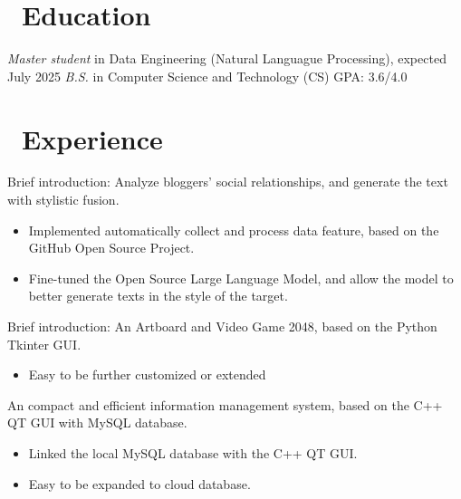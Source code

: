 \documentclass{resume}
\begin{document}



\section{\faGraduationCap\ Education}
\textit{Master student} in Data Engineering (Natural Languague Processing), expected July 2025
\textit{B.S.} in Computer Science and Technology (CS) GPA: 3.6/4.0

\section{\faUsers\ Experience}
Brief introduction: Analyze bloggers' social relationships, and generate the text with stylistic fusion.
\begin{itemize}
  \item Implemented automatically collect and process data feature, based on the GitHub Open Source Project.
  \item Fine-tuned the Open Source Large Language Model, and allow the model to better generate texts in the style of the target.
\end{itemize}

Brief introduction: An Artboard and Video Game 2048, based on the Python Tkinter GUI.
\begin{itemize}
  \item Easy to be further customized or extended

\end{itemize}


An compact and efficient information management system, based on the C++ QT GUI with MySQL database.
\begin{itemize}
  \item Linked the local MySQL database with the C++ QT GUI.
  \item Easy to be expanded to cloud database.
\end{itemize}
\end{document}
